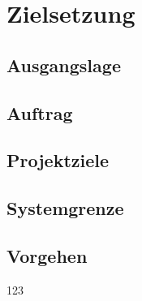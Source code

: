 \chapter{Zielsetzung}

\section{Ausgangslage}
\section{Auftrag}
\section{Projektziele}


\section{Systemgrenze}
\section{Vorgehen}
123